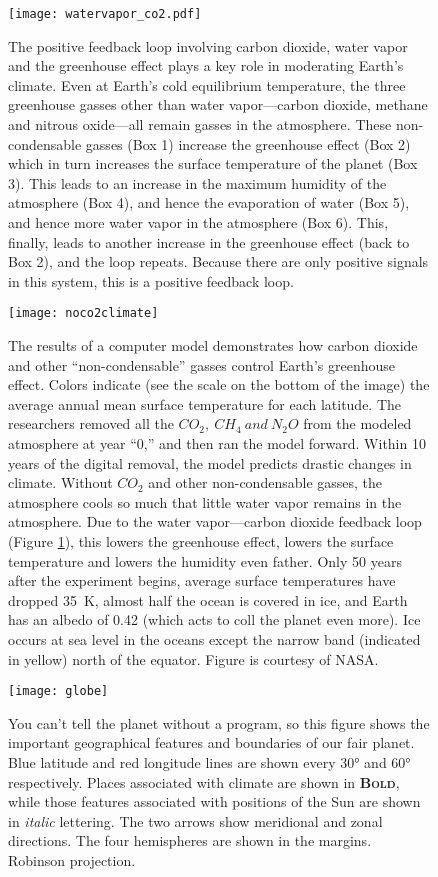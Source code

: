 \documentclass[amstex,12pt]{book}
\begin{document}
\begin{figure}[p]
\centering
\texttt{[image: watervapor\_co2.pdf]}%
\caption{The positive feedback loop involving carbon dioxide, water vapor and the greenhouse effect plays a key role in moderating Earth's climate. Even at Earth's cold equilibrium temperature, the three greenhouse gasses other than water vapor---carbon dioxide, methane and nitrous oxide---all remain gasses in the atmosphere. These non-condensable gasses (Box 1) increase the greenhouse effect (Box 2) which in turn increases the surface temperature of the planet (Box 3). This leads to an increase in the maximum humidity of the atmosphere (Box 4), and hence the evaporation of water (Box 5), and hence more water vapor in the atmosphere (Box 6). This, finally, leads to another increase in the greenhouse effect (back to Box 2), and the loop repeats. Because there are only positive signals in this system, this is a positive feedback loop.}   
\label{fig:wvco2}
\end{figure}

\begin{figure}[p]
\centering
\texttt{[image: noco2climate]}%
\caption{The results of a computer model demonstrates how carbon dioxide and other ``non-condensable'' gasses control Earth's greenhouse effect. Colors indicate (see the scale on the bottom of the image) the average annual mean surface temperature for each latitude. The researchers removed all the $CO_2,\ CH_4\ and\ N_2O$ from the modeled atmosphere at year ``0,'' and then ran the model forward. Within 10 years of the digital removal, the model predicts drastic changes in climate. Without $CO_2$ and other non-condensable gasses, the atmosphere cools so much that little water vapor remains in the atmosphere. Due to the water vapor---carbon dioxide feedback loop (Figure \ref{fig:wvco2}), this lowers the greenhouse effect, lowers the surface temperature and lowers the humidity even father. Only 50 years after the experiment begins, average surface temperatures have dropped \SI{35}{\kelvin}, almost half the ocean is covered in ice, and Earth has an albedo of 0.42 (which acts to coll the planet even more). Ice occurs at sea level in the oceans except the narrow band (indicated in yellow) north of the equator. Figure is courtesy of NASA.}   
\label{fig:noco2earth}
\end{figure}

\begin{figure}[p]
\centering
\texttt{[image: globe]}%
\caption{You can't tell the planet without a program, so this figure shows the important geographical features and boundaries of our fair planet. Blue latitude and red longitude lines are shown every $\ang{30}$ and $\ang{60}$ respectively. Places associated with climate are shown in \textbf{\textsc{Bold}}, while those features associated with positions of the Sun are shown in \textit{italic} lettering. The two arrows show meridional and zonal directions. The four hemispheres are shown in the margins. Robinson projection.}   
\label{fig:globe}
\end{figure}
\end{document}
